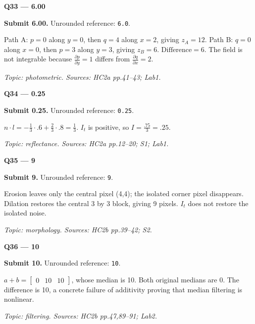 \documentclass[11pt,a4paper]{article}
\begin{document}
\par\vspace{12pt}
\begin{minipage}{\linewidth}
\textbf{Q33 — 6.00}\par\smallskip
\textbf{Submit 6.00.} Unrounded reference: \texttt{6.0}.\par
Path A: \(p=0\) along \(y=0\),\allowbreak{} then \(q=4\) along \(x=2\),\allowbreak{} giving \(z_A=12\). Path B: \(q=0\) along \(x=0\),\allowbreak{} then \(p=3\) along \(y=3\),\allowbreak{} giving \(z_B=6\). \(\text{Difference}=6\). The field is not integrable because \(\frac{\partial p}{\partial y}=1\) differs from \(\frac{\partial q}{\partial x}=2\).\par
{\small\itshape Topic: photometric. Sources: HC2a pp.41–43; Lab1.}

\end{minipage}
\par\vspace{12pt}
\begin{minipage}{\linewidth}
\textbf{Q34 — 0.25}\par\smallskip
\textbf{Submit 0.25.} Unrounded reference: \texttt{0.25}.\par
\(n\cdot l=-\frac{1}{3}\cdot.6+\frac{2}{3}\cdot.8=\frac{1}{3}\). \(I_t\) is positive,\allowbreak{} so \(I=\frac{.75}{3}=.25\).\par
{\small\itshape Topic: reflectance. Sources: HC2a pp.12–20; S1; Lab1.}

\end{minipage}
\par\vspace{12pt}
\begin{minipage}{\linewidth}
\textbf{Q35 — 9}\par\smallskip
\textbf{Submit 9.} Unrounded reference: \texttt{9}.\par
Erosion leaves only the central pixel (4,\allowbreak{}4); the isolated corner pixel disappears. Dilation restores the central 3 by 3 block,\allowbreak{} giving 9 pixels. \(I_t\) does not restore the isolated noise.\par
{\small\itshape Topic: morphology. Sources: HC2b pp.39–42; S2.}

\end{minipage}
\par\vspace{12pt}
\begin{minipage}{\linewidth}
\textbf{Q36 — 10}\par\smallskip
\textbf{Submit 10.} Unrounded reference: \texttt{10}.\par
\(a+b=\begin{bmatrix}0&10&10\end{bmatrix}\),\allowbreak{} whose median is 10. Both original medians are 0. The difference is 10,\allowbreak{} a concrete failure of additivity proving that median filtering is nonlinear.\par
{\small\itshape Topic: filtering. Sources: HC2b pp.47,\allowbreak{}89–91; Lab2.}

\end{minipage}
\end{document}
